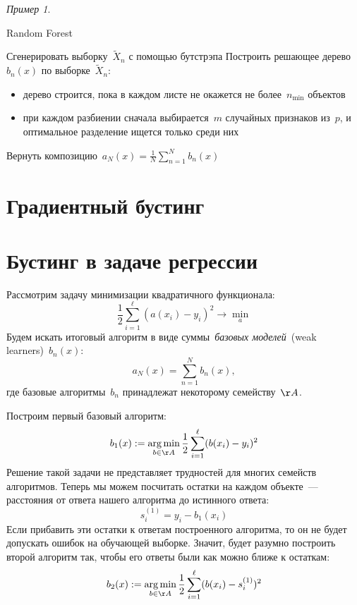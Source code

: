 \documentclass[a4paper, 12pt]{article}
\newcommand{\argmin}{\mathop{\rm arg\,min}\limits}
\theoremstyle{plain} %
\theoremstyle{definition} %
\theoremstyle{remark} %
\newtheorem{example}{Пример}
\begin{document}
\begin{example}
\begin{centering}
	\begin{algorithm}[t]
	\caption{Random Forest}
	\label{alg:rf}
	    \begin{algorithmic}[1]
	            \STATE Сгенерировать выборку~$\tilde X_n$ с помощью бутстрэпа
	            \STATE Построить решающее дерево~$b_n(x)$ по выборке~$\tilde X_n$:
	                \begin{itemize}
	                    \item дерево строится, пока в каждом листе не окажется не более~$n_{\min}$ объектов
	                    \item при каждом разбиении сначала выбирается~$m$ случайных
	                        признаков из~$p$, и оптимальное разделение ищется только среди них
	                \end{itemize}
	        \ENDFOR
	        \STATE Вернуть композицию~$a_N(x) = \frac{1}{N} \sum_{n = 1}^{N} b_n(x)$
	    \end{algorithmic}
	\end{algorithm}
\end{centering}


\section{Градиентный бустинг}

\section{Бустинг в задаче регрессии}\label{section:regBoost}
Рассмотрим задачу минимизации квадратичного функционала:
\[
    \frac12
    \sum_{i = 1}^{\ell}
        (a(x_i) - y_i)^2
    \to
    \min_{a}
\]
Будем искать итоговый алгоритм в виде суммы~\emph{базовых моделей}~(weak learners)~$b_n(x)$:
\[
    a_N(x)
    =
    \sum_{n = 1}^{N}
        b_n(x),
\]
где базовые алгоритмы~$b_n$ принадлежат некоторому семейству~$\AA$.

Построим первый базовый алгоритм:
\[
    b_1(x)
    :=
    \argmin_{b \in \AA}
        \frac12
        \sum_{i = 1}^{\ell}
            (b(x_i) - y_i)^2
\]
Решение такой задачи не представляет трудностей для многих семейств алгоритмов.
Теперь мы можем посчитать остатки на каждом объекте~--- расстояния от ответа
нашего алгоритма до истинного ответа:
\[
    s_i^{(1)} = y_i - b_1(x_i)
\]
Если прибавить эти остатки к ответам построенного алгоритма, то он не будет допускать
ошибок на обучающей выборке.
Значит, будет разумно построить второй алгоритм так, чтобы его ответы
были как можно ближе к остаткам:
\[
    b_2(x)
    :=
    \argmin_{b \in \AA}
        \frac12
        \sum_{i = 1}^{\ell}
            (b(x_i) - s_i^{(1)})^2
\]


\end{example}
\end{document}
